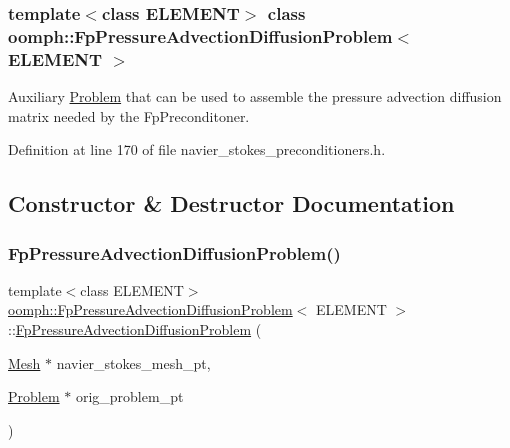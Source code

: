 \subsubsection*{template$<$class E\+L\+E\+M\+E\+NT$>$\newline
class oomph\+::\+Fp\+Pressure\+Advection\+Diffusion\+Problem$<$ E\+L\+E\+M\+E\+N\+T $>$}

Auxiliary \hyperlink{classoomph_1_1Problem}{Problem} that can be used to assemble the pressure advection diffusion matrix needed by the Fp\+Preconditoner. 

Definition at line 170 of file navier\+\_\+stokes\+\_\+preconditioners.\+h.



\subsection{Constructor \& Destructor Documentation}
\mbox{\label{classoomph_1_1FpPressureAdvectionDiffusionProblem_a6e592be14db55b57bf8045c5c7d1993b}} 
\subsubsection{\texorpdfstring{Fp\+Pressure\+Advection\+Diffusion\+Problem()}{FpPressureAdvectionDiffusionProblem()}}
{\footnotesize\ttfamily template$<$class E\+L\+E\+M\+E\+NT$>$ \\
\hyperlink{classoomph_1_1FpPressureAdvectionDiffusionProblem}{oomph\+::\+Fp\+Pressure\+Advection\+Diffusion\+Problem}$<$ E\+L\+E\+M\+E\+NT $>$\+::\hyperlink{classoomph_1_1FpPressureAdvectionDiffusionProblem}{Fp\+Pressure\+Advection\+Diffusion\+Problem} (\begin{DoxyParamCaption}\item[{\hyperlink{classoomph_1_1Mesh}{Mesh} $\ast$}]{navier\+\_\+stokes\+\_\+mesh\+\_\+pt,  }\item[{\hyperlink{classoomph_1_1Problem}{Problem} $\ast$}]{orig\+\_\+problem\+\_\+pt }\end{DoxyParamCaption})\hspace{0.3cm}{\ttfamily [inline]}}



